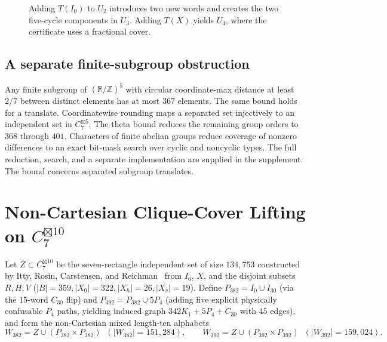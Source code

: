 \documentclass[11pt,letterpaper]{article}
\theoremstyle{definition}
\theoremstyle{remark}
\begin{document}
\begin{figure}[!htbp]
\centering
{}
\caption{Adding $T(I_0)$ to $U_2$ introduces two new words and creates the two five-cycle components in $U_3$. Adding $T(X)$ yields $U_4$, where the certificate uses a fractional cover.}
\end{figure}

\subsection{A separate finite-subgroup obstruction}
Any finite subgroup of $(\mathbb{R}/\mathbb{Z})^5$ with circular coordinate-max distance at least $2/7$ between distinct elements has at most $367$ elements. The same bound holds for a translate. Coordinatewise rounding maps a separated set injectively to an independent set in $C_7^{\boxtimes 5}$. The theta bound reduces the remaining group orders to $368$ through $401$. Characters of finite abelian groups reduce coverage of nonzero differences to an exact bit-mask search over cyclic and noncyclic types. The full reduction, search, and a separate implementation are supplied in the supplement. The bound concerns separated subgroup translates.

\section{Non-Cartesian Clique-Cover Lifting on $C_7^{\boxtimes 10}$}
Let $Z \subset C_7^{\boxtimes 10}$ be the seven-rectangle independent set of size $134{,}753$ constructed by Itty, Rosin, Carstensen, and Reichman~\cite{IRCR2026} from $I_0$, $X$, and the disjoint subsets $R, H, V$ ($|B|=359, |X_0|=322, |X_h|=26, |X_v|=19$). Define $P_{382} = I_0 \cup I_{30}$ (via the 15-word $C_{30}$ flip) and $P_{392} = P_{382} \cup 5P_4$ (adding five explicit physically confusable $P_4$ paths, yielding induced graph $342K_1 + 5P_4 + C_{30}$ with $45$ edges), and form the non-Cartesian mixed length-ten alphabets
\[
  W_{382} = Z \cup (P_{382} \times P_{382}) \;\; (|W_{382}| = 151{,}284), \qquad
  W_{392} = Z \cup (P_{392} \times P_{392}) \;\; (|W_{392}| = 159{,}024).
\]
\end{document}
